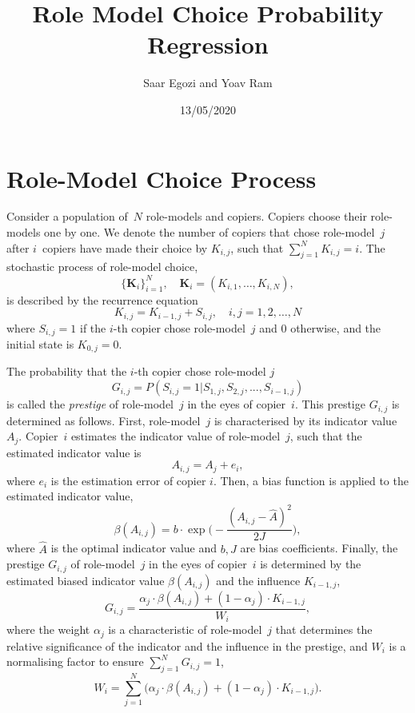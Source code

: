 \documentclass[11pt]{article}
\title{Role Model Choice Probability Regression}
\author{Saar Egozi and Yoav Ram}
\date{13/05/2020}
\let\vec\mathbf
\begin{document}
\begin{titlepage}
\maketitle
\end{titlepage}

\section*{Role-Model Choice Process}
Consider a population of~$N$ role-models and copiers.
Copiers choose their role-models one by one.
We denote the number of copiers that chose role-model~$j$ after $i$~copiers have made their choice by $K_{i,j}$, such that $\sum_{j=1}^N{K_{i,j}} = i$. 
The stochastic process of role-model choice, 
\begin{equation} \label{eq:process}
\big\{\vec{K}_i\big\}_{i=1}^N, \quad \vec{K}_i=(K_{i,1}, \ldots, K_{i,N}),
\end{equation}
is described by the recurrence equation
\begin{equation} \label{eq:recurrence}
K_{i,j} = K_{i-1,j} + S_{i,j}, \quad i,j=1,2,\ldots,N
\end{equation}
where $S_{i,j}=1$ if the $i$-th copier chose role-model~$j$ and 0 otherwise, and the initial state is $K_{0,j}=0$.

The probability that the $i$-th copier chose role-model $j$
\begin{equation} 
G_{i,j}=P(S_{i,j}=1| S_{1,j},S_{2,j},...,S_{i-1,j})
\end{equation}
is called the \emph{prestige} of role-model~$j$ in the eyes of copier~$i$.
This prestige $G_{i,j}$ is determined as follows.
First, role-model~$j$ is characterised by its indicator value $A_j$.
Copier~$i$ estimates the indicator value of role-model~$j$, such that the estimated indicator value is
\begin{equation}
A_{i,j} = A_j + e_i,
\end{equation}
where $e_i$ is the estimation error of copier $i$. 
Then, a bias function is applied to the estimated indicator value,
\begin{equation}
\beta(A_{i,j}) = b \cdot \exp{\Big(-\frac{(A_{i,j} - \hat{A})^2}{2J}\Big)},
\end{equation}
where $\hat{A}$ is the optimal indicator value and $b,J$ are bias coefficients.
Finally, the prestige $G_{i,j}$ of role-model~$j$ in the eyes of copier~$i$ is determined by the estimated biased indicator value $\beta(A_{i,j})$ and the influence $K_{i-1,j}$, 
\begin{equation}\label{prestige_eq}
G_{i,j} = \frac{\alpha_j \cdot \beta(A_{i,j}) + (1-\alpha_j) \cdot K_{i-1,j}}{W_i},
\end{equation}
where the weight $\alpha_j$ is a characteristic of role-model~$j$ that determines the relative significance of the indicator and the influence in the prestige, and $W_i$ is a normalising factor to ensure $\sum_{j=1}^N{G_{i,j}}=1$,
\begin{equation}
W_i = \sum_{j=1}^N{\Big(\alpha_j \cdot \beta(A_{i,j}) + (1-\alpha_j) \cdot K_{i-1,j}\Big)}.
\end{equation}
\end{document}
